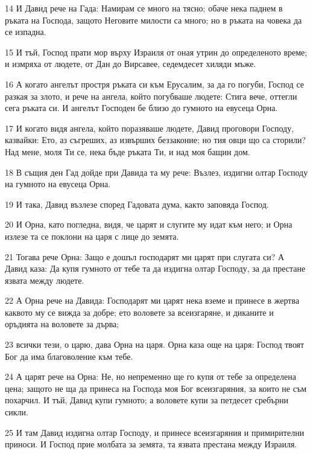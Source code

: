 \par 14 И Давид рече на Гада: Намирам се много на тясно; обаче нека паднем в ръката на Господа, защото Неговите милости са много; но в ръката на човека да се изпадна.
\par 15 И тъй, Господ прати мор върху Израиля от оная утрин до определеното време; и измряха от людете, от Дан до Вирсавее, седемдесет хиляди мъже.
\par 16 А когато ангелът простря ръката си към Ерусалим, за да го погуби, Господ се разкая за злото, и рече на ангела, който погубваше людете: Стига вече, оттегли сега ръката си. И ангелът Господен бе близо до гумното на евусеца Орна.
\par 17 И когато видя ангела, който поразяваше людете, Давид проговори Господу, казвайки: Ето, аз съгреших, аз извърших беззаконие; но тия овци що са сторили? Над мене, моля Ти се, нека бъде ръката Ти, и над моя бащин дом.
\par 18 В същия ден Гад дойде при Давида та му рече: Възлез, издигни олтар Господу на гумното на евусеца Орна.
\par 19 И така, Давид възлезе според Гадовата дума, както заповяда Господ.
\par 20 И Орна, като погледна, видя, че царят и слугите му идат към него; и Орна излезе та се поклони на царя с лице до земята.
\par 21 Тогава рече Орна: Защо е дошъл господарят ми царят при слугата си? А Давид каза: Да купя гумното от тебе та да издигна олтар Господу, за да престане язвата между людете.
\par 22 А Орна рече на Давида: Господарят ми царят нека вземе и принесе в жертва каквото му се вижда за добре; ето воловете за всеизгаряне, и диканите и оръдията на воловете за дърва;
\par 23 всички тези, о царю, дава Орна на царя. Орна каза още на царя: Господ твоят Бог да има благоволение към тебе.
\par 24 А царят рече на Орна: Не, но непременно ще го купя от тебе за определена цена; защото не ща да принеса на Господа моя Бог всеизгаряния, за които не съм похарчил. И тъй, Давид купи гумното; а воловете купи за петдесет сребърни сикли.
\par 25 И там Давид издигна олтар Господу, и принесе всеизгаряния и примирителни приноси. И Господ прие молбата за земята, та язвата престана между Израиля.

